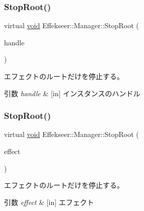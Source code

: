\subsubsection{\texorpdfstring{Stop\+Root()}{StopRoot()}\hspace{0.1cm}{\footnotesize\ttfamily [1/2]}}
{\footnotesize\ttfamily virtual \mbox{\hyperlink{namespace_effekseer_ab34c4088e512200cf4c2716f168deb56}{void}} Effekseer\+::\+Manager\+::\+Stop\+Root (\begin{DoxyParamCaption}\item[{\mbox{\hyperlink{namespace_effekseer_afba58b8d812da862190e9bbfc040824a}{Handle}}}]{handle }\end{DoxyParamCaption})\hspace{0.3cm}{\ttfamily [pure virtual]}}



エフェクトのルートだけを停止する。 


\begin{DoxyParams}{引数}
{\em handle} & \mbox{[}in\mbox{]} インスタンスのハンドル \\
\hline
\end{DoxyParams}
\mbox{\label{class_effekseer_1_1_manager_ad7989b68ceb3125cf6ef0d4062462a3d}} 
\subsubsection{\texorpdfstring{Stop\+Root()}{StopRoot()}\hspace{0.1cm}{\footnotesize\ttfamily [2/2]}}
{\footnotesize\ttfamily virtual \mbox{\hyperlink{namespace_effekseer_ab34c4088e512200cf4c2716f168deb56}{void}} Effekseer\+::\+Manager\+::\+Stop\+Root (\begin{DoxyParamCaption}\item[{\mbox{\hyperlink{class_effekseer_1_1_effect}{Effect}} $\ast$}]{effect }\end{DoxyParamCaption})\hspace{0.3cm}{\ttfamily [pure virtual]}}



エフェクトのルートだけを停止する。 


\begin{DoxyParams}{引数}
{\em effect} & \mbox{[}in\mbox{]} エフェクト \\
\hline
\end{DoxyParams}
\mbox{\label{class_effekseer_1_1_manager_ac086ec64cb5f99172e8bf655b77e1464}} 
